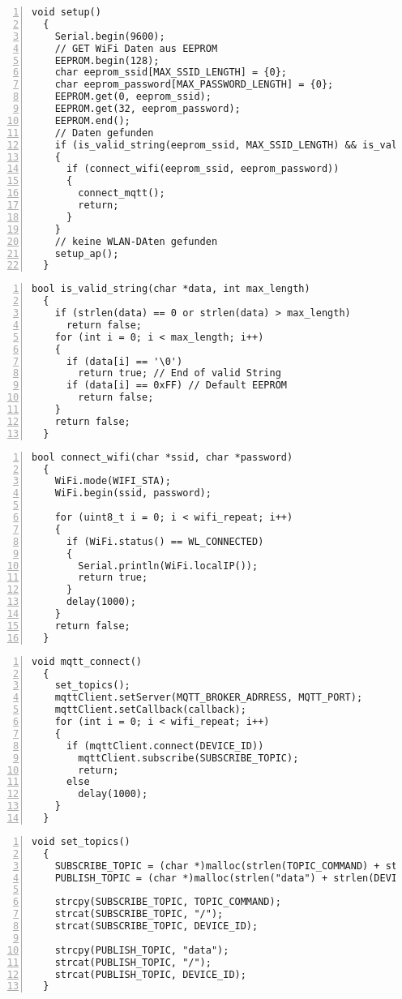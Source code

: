 \documentclass[12pt, letterpaper]{article}
\begin{document}
\begin{lstlisting}[frame=single, style=cpp, numbers=left, label={lst:esp8266setup}, caption={ESP: setup}]
  void setup()
  {
    Serial.begin(9600);
    // GET WiFi Daten aus EEPROM
    EEPROM.begin(128);
    char eeprom_ssid[MAX_SSID_LENGTH] = {0};
    char eeprom_password[MAX_PASSWORD_LENGTH] = {0};
    EEPROM.get(0, eeprom_ssid);
    EEPROM.get(32, eeprom_password);
    EEPROM.end();
    // Daten gefunden
    if (is_valid_string(eeprom_ssid, MAX_SSID_LENGTH) && is_valid_string(eeprom_password, MAX_PASSWORD_LENGTH))
    {
      if (connect_wifi(eeprom_ssid, eeprom_password))
      {
        connect_mqtt();
        return;
      }
    }
    // keine WLAN-DAten gefunden
    setup_ap();
  }
\end{lstlisting}
\begin{lstlisting}[frame=single, style=cpp, numbers=left, label={lst:esp8266validstring}, caption={ESP: is\_valid\_string}]
  bool is_valid_string(char *data, int max_length)
  {
    if (strlen(data) == 0 or strlen(data) > max_length)
      return false;
    for (int i = 0; i < max_length; i++)
    {
      if (data[i] == '\0')
        return true; // End of valid String
      if (data[i] == 0xFF) // Default EEPROM
        return false;
    }
    return false;
  }
\end{lstlisting}
\begin{lstlisting}[frame=single, style=cpp, numbers=left, label={lst:espconnectwifi}, caption={ESP: connect\_wifi}]
  bool connect_wifi(char *ssid, char *password)
  {
    WiFi.mode(WIFI_STA);
    WiFi.begin(ssid, password);
  
    for (uint8_t i = 0; i < wifi_repeat; i++)
    {
      if (WiFi.status() == WL_CONNECTED)
      {
        Serial.println(WiFi.localIP());
        return true;
      }
      delay(1000);
    }
    return false;
  }
\end{lstlisting}
\begin{lstlisting}[frame=single, style=cpp, numbers=left, label={lst:espconnectmqtt}, caption={ESP: connect\_mqtt}]
  void mqtt_connect()
  {
    set_topics();
    mqttClient.setServer(MQTT_BROKER_ADRRESS, MQTT_PORT);
    mqttClient.setCallback(callback);
    for (int i = 0; i < wifi_repeat; i++)
    {
      if (mqttClient.connect(DEVICE_ID))
        mqttClient.subscribe(SUBSCRIBE_TOPIC);
        return;
      else
        delay(1000);
    }
  }
\end{lstlisting}
\begin{lstlisting}[frame=single, style=cpp, numbers=left, label={lst:espsettopics}, caption={ESP: set\_topics}]
  void set_topics()
  {
    SUBSCRIBE_TOPIC = (char *)malloc(strlen(TOPIC_COMMAND) + strlen(DEVICE_ID) + 2);
    PUBLISH_TOPIC = (char *)malloc(strlen("data") + strlen(DEVICE_ID) + 2);
  
    strcpy(SUBSCRIBE_TOPIC, TOPIC_COMMAND);
    strcat(SUBSCRIBE_TOPIC, "/");
    strcat(SUBSCRIBE_TOPIC, DEVICE_ID);
  
    strcpy(PUBLISH_TOPIC, "data");
    strcat(PUBLISH_TOPIC, "/");
    strcat(PUBLISH_TOPIC, DEVICE_ID);
  }
\end{lstlisting}
\end{document}
